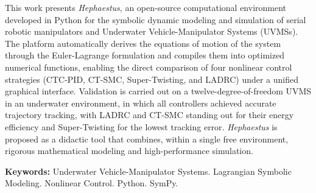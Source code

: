 \begin{foreignabstract}

This work presents \textit{Hephaestus}, an open-source computational environment developed in Python for the symbolic dynamic modeling and simulation of serial robotic manipulators and Underwater Vehicle-Manipulator Systems (UVMSs). The platform automatically derives the equations of motion of the system through the Euler-Lagrange formulation and compiles them into optimized numerical functions, enabling the direct comparison of four nonlinear control strategies (CTC-PID, CT-SMC, Super-Twisting, and LADRC) under a unified graphical interface. Validation is carried out on a twelve-degree-of-freedom UVMS in an underwater environment, in which all controllers achieved accurate trajectory tracking, with LADRC and CT-SMC standing out for their energy efficiency and Super-Twisting for the lowest tracking error. \textit{Hephaestus} is proposed as a didactic tool that combines, within a single free environment, rigorous mathematical modeling and high-performance simulation.

\textbf{Keywords:} Underwater Vehicle-Manipulator Systems. Lagrangian Symbolic Modeling. Nonlinear Control. Python. SymPy.

\end{foreignabstract}
